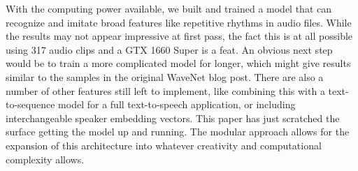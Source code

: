 With the computing power available, we built and trained a model that can recognize and imitate broad features like repetitive rhythms in audio files. While the results may not appear impressive at first pass, the fact this is at all possible using 317 audio clips and a GTX 1660 Super is a feat.  An obvious next step would be to train a more complicated model for longer, which might give results similar to the samples in the original WaveNet blog post. There are also a number of other features still left to implement, like combining this with a text-to-sequence model for a full text-to-speech application, or including interchangeable speaker embedding vectors. This paper has just scratched the surface getting the model up and running. The modular approach allows for the expansion of this architecture into whatever creativity and computational complexity allows.